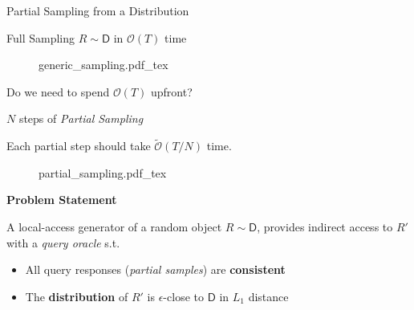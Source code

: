 \begin{block}{Partial Sampling from a Distribution}



\begin{alertblock}{Full Sampling $R \sim\mathsf D$ in $\mathcal O (T)$ time}

\begin{figure}[h!]\centering
    \def\svgwidth{0.5\columnwidth}
    {generic_sampling.pdf_tex}
\end{figure}
Do we need to spend $\mathcal{O}(T)$ upfront?

\end{alertblock}


\begin{alertblock}{$N$ steps of \emph{Partial Sampling}}

\begin{center}
Each partial step should take $\tilde{\mathcal O} (T/N)$ time.
\end{center}

\begin{figure}[h!]\centering
    \def\svgwidth{0.7\columnwidth}
    {partial_sampling.pdf_tex}
\end{figure}

\end{alertblock}


\begin{alertblock}{\textbf{Problem Statement}}

A local-access generator of a random object $R \sim\mathsf D$,
provides indirect access to $R'$ with a \emph{query oracle} s.t.
\begin{itemize}
    \item All query responses (\emph{partial samples}) are \textbf{consistent}
    \item The \textbf{distribution} of $R'$ is $\epsilon$-close to $\mathsf D$ in $L_1$ distance
\end{itemize}

\end{alertblock}



\end{block}

